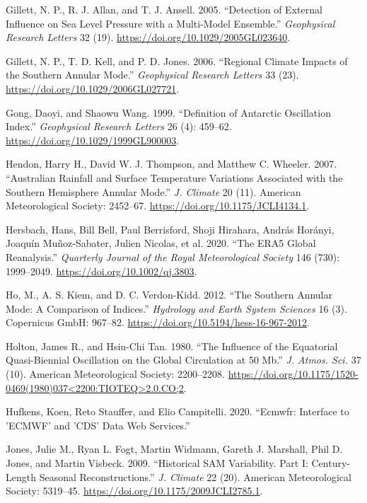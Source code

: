 \documentclass[smallextended]{svjour3}       %
\begin{document}
\leavevmode\hypertarget{ref-gillett2005}{}%
Gillett, N. P., R. J. Allan, and T. J. Ansell. 2005. ``Detection of External Influence on Sea Level Pressure with a Multi-Model Ensemble.'' \emph{Geophysical Research Letters} 32 (19). \url{https://doi.org/10.1029/2005GL023640}.

\leavevmode\hypertarget{ref-gillett2006}{}%
Gillett, N. P., T. D. Kell, and P. D. Jones. 2006. ``Regional Climate Impacts of the Southern Annular Mode.'' \emph{Geophysical Research Letters} 33 (23). \url{https://doi.org/10.1029/2006GL027721}.

\leavevmode\hypertarget{ref-gong1999}{}%
Gong, Daoyi, and Shaowu Wang. 1999. ``Definition of Antarctic Oscillation Index.'' \emph{Geophysical Research Letters} 26 (4): 459--62. \url{https://doi.org/10.1029/1999GL900003}.

\leavevmode\hypertarget{ref-hendon2007}{}%
Hendon, Harry H., David W. J. Thompson, and Matthew C. Wheeler. 2007. ``Australian Rainfall and Surface Temperature Variations Associated with the Southern Hemisphere Annular Mode.'' \emph{J. Climate} 20 (11). American Meteorological Society: 2452--67. \url{https://doi.org/10.1175/JCLI4134.1}.

\leavevmode\hypertarget{ref-hersbach2020}{}%
Hersbach, Hans, Bill Bell, Paul Berrisford, Shoji Hirahara, András Horányi, Joaquín Muñoz-Sabater, Julien Nicolas, et al. 2020. ``The ERA5 Global Reanalysis.'' \emph{Quarterly Journal of the Royal Meteorological Society} 146 (730): 1999--2049. \url{https://doi.org/10.1002/qj.3803}.

\leavevmode\hypertarget{ref-ho2012}{}%
Ho, M., A. S. Kiem, and D. C. Verdon-Kidd. 2012. ``The Southern Annular Mode: A Comparison of Indices.'' \emph{Hydrology and Earth System Sciences} 16 (3). Copernicus GmbH: 967--82. \url{https://doi.org/10.5194/hess-16-967-2012}.

\leavevmode\hypertarget{ref-holton1980}{}%
Holton, James R., and Hsiu-Chi Tan. 1980. ``The Influence of the Equatorial Quasi-Biennial Oscillation on the Global Circulation at 50 Mb.'' \emph{J. Atmos. Sci.} 37 (10). American Meteorological Society: 2200--2208. \href{https://doi.org/10.1175/1520-0469(1980)037\%3C2200:TIOTEQ\%3E2.0.CO;2}{https://doi.org/10.1175/1520-0469(1980)037\textless{}2200:TIOTEQ\textgreater{}2.0.CO;2}.

\leavevmode\hypertarget{ref-hufkens2020}{}%
Hufkens, Koen, Reto Stauffer, and Elio Campitelli. 2020. ``Ecmwfr: Interface to 'ECMWF' and 'CDS' Data Web Services.''

\leavevmode\hypertarget{ref-jones2009}{}%
Jones, Julie M., Ryan L. Fogt, Martin Widmann, Gareth J. Marshall, Phil D. Jones, and Martin Visbeck. 2009. ``Historical SAM Variability. Part I: Century-Length Seasonal Reconstructions.'' \emph{J. Climate} 22 (20). American Meteorological Society: 5319--45. \url{https://doi.org/10.1175/2009JCLI2785.1}.
\end{document}
